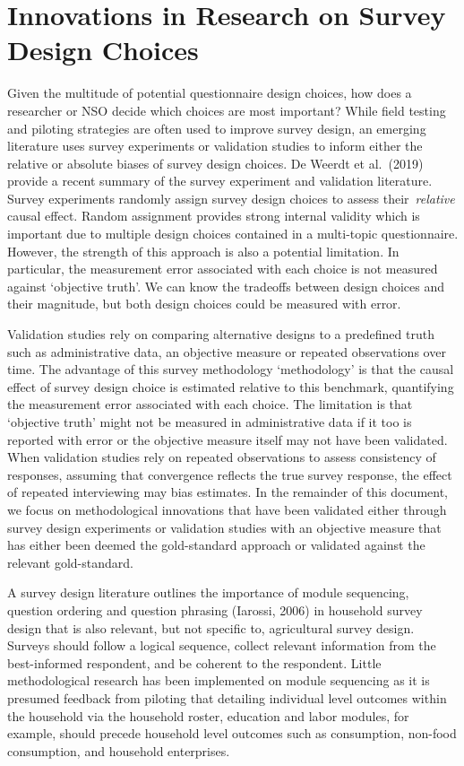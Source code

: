 \documentclass[
]{book}
\begin{document}
\hypertarget{innovations-in-research-on-survey-design-choices}{%
\section{Innovations in Research on Survey Design Choices}\label{innovations-in-research-on-survey-design-choices}}

Given the multitude of potential questionnaire design choices, how does a researcher or NSO decide which choices are most important? While field testing and piloting strategies are often used to improve survey design, an emerging literature uses survey experiments or validation studies to inform either the relative or absolute biases of survey design choices. De Weerdt et al.~(2019) provide a recent summary of the survey experiment and validation literature. Survey experiments randomly assign survey design choices to assess their~\emph{relative} causal effect. Random assignment provides strong internal validity which is important due to multiple design choices contained in a multi-topic questionnaire. However, the strength of this approach is also a potential limitation. In particular, the measurement error associated with each choice is not measured against `objective truth'. We can know the tradeoffs between design choices and their magnitude, but both design choices could be measured with error.

Validation studies rely on comparing alternative designs to a predefined truth such as administrative data, an objective measure or repeated observations over time. The advantage of this survey methodology `methodology' is that the causal effect of survey design choice is estimated relative to this benchmark, quantifying the measurement error associated with each choice. The limitation is that `objective truth' might not be measured in administrative data if it too is reported with error or the objective measure itself may not have been validated. When validation studies rely on repeated observations to assess consistency of responses, assuming that convergence reflects the true survey response, the effect of repeated interviewing may bias estimates. In the remainder of this document, we focus on methodological innovations that have been validated either through survey design experiments or validation studies with an objective measure that has either been deemed the gold-standard approach or validated against the relevant gold-standard.

A survey design literature outlines the importance of module sequencing, question ordering and question phrasing (Iarossi, 2006) in household survey design that is also relevant, but not specific to, agricultural survey design. Surveys should follow a logical sequence, collect relevant information from the best-informed respondent, and be coherent to the respondent. Little methodological research has been implemented on module sequencing as it is presumed feedback from piloting that detailing individual level outcomes within the household via the household roster, education and labor modules, for example, should precede household level outcomes such as consumption, non-food consumption, and household enterprises.
\end{document}
